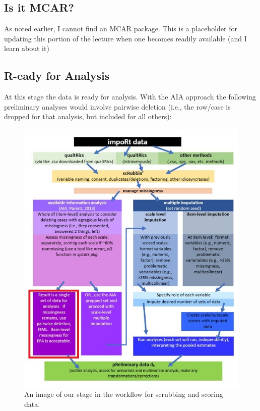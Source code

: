 \documentclass[
  english,
]{book}
\begin{document}
\hypertarget{is-it-mcar}{%
\subsection{Is it MCAR?}\label{is-it-mcar}}

As noted earlier, I cannot find an MCAR package. This is a placeholder for updating this portion of the lecture when one becomes readily available (and I learn about it)

\hypertarget{r-eady-for-analysis}{%
\subsection{R-eady for Analysis}\label{r-eady-for-analysis}}

At this stage the data is ready for analysis. With the AIA approach \citep{parent_handling_2013} the following preliminary analyses would involve pairwise deletion (i.e., the row/case is dropped for that analysis, but included for all others):

\begin{figure}
\centering
\includegraphics{images/Ch02/wrkflow_AIAready.jpg}
\caption{An image of our stage in the workflow for scrubbing and scoring data.}
\end{figure}
\end{document}
